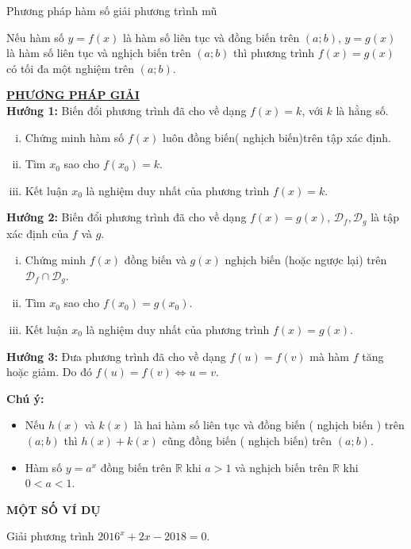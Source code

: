 \begin{dang}{Phương pháp hàm số giải phương trình mũ}
\begin{dl}
Nếu hàm số $y=f(x)$ là hàm số liên tục và đồng biến trên $\left(a;b\right)$, $y=g(x)$ là hàm số liên tục và nghịch biến trên $\left(a;b\right)$ thì phương trình $f(x)=g(x)$ có tối đa một nghiệm trên $\left(a;b\right)$.
\end{dl}
\underline{\textbf{PHƯƠNG PHÁP GIẢI}}\\
\textbf{Hướng 1:} Biến đổi phương trình đã cho về dạng $f(x)=k$, với $k$ là hằng số.
\begin{enumerate}[i.]
  \item Chứng minh hàm số $f(x)$ luôn đồng biến( nghịch biến)trên tập xác định.
  \item Tìm $x_0$ sao cho $f(x_0)=k$.
  \item Kết luận $x_0$ là nghiệm duy nhất của phương trình $f(x)=k$.
\end{enumerate}
\textbf{Hướng 2:} Biến đổi phương trình đã cho về dạng $f(x)=g(x)$, $\mathscr{D}_f,\mathscr{D}_g$ là tập xác định của $f$ và $g$.
\begin{enumerate}[i.]%
  \item Chứng minh $f(x)$ đồng biến và $g(x)$ nghịch biến (hoặc ngược lại) trên $\mathscr{D}_f \cap \mathscr{D}_g$.
  \item Tìm $x_0$ sao cho $f(x_0)=g(x_0)$.
  \item Kết luận $x_0$ là nghiệm duy nhất của phương trình $f(x)=g(x)$.
\end{enumerate}
\textbf{Hướng 3:} Đưa phương trình đã cho về dạng $f(u)=f(v)$ mà hàm $f$ tăng hoặc giảm. Do đó $f(u)=f(v)\Leftrightarrow u=v$.
\begin{note}\textbf{Chú ý:}
\begin{itemize}
\item Nếu $h(x)$ và $k(x)$ là hai hàm số liên tục và đồng biến ( nghịch biến ) trên $\left(a;b\right)$ thì $h(x)+k(x)$ cũng đồng biến ( nghịch biến) trên $\left(a;b\right)$.
\item Hàm số $y=a^x$ đồng biến trên $\mathbb{R}$ khi $a>1$ và nghịch biến trên $\mathbb{R}$ khi $0<a<1$.
\end{itemize}
\end{note}
\end{dang}
\begin{center}
\textbf{MỘT SỐ VÍ DỤ}
\end{center}
\begin{vd}%
Giải phương trình $2016^x+2x-2018=0$.
\end{vd}
